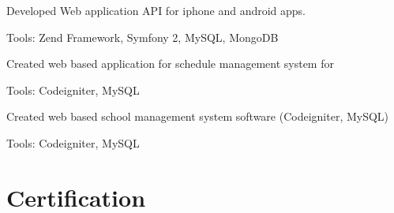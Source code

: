 \documentclass[]{deedy-resume-openfont}
\begin{document}
\begin{minipage}[t]{0.66\textwidth}
\begin{tightemize}
\item Developed Web application API for iphone and android apps.
\item Tools: Zend Framework, Symfony 2, MySQL, MongoDB
\end{tightemize}
\sectionsep

\begin{tightemize}
\item Created web based application for schedule management system for 
\item Tools: Codeigniter, MySQL
\end{tightemize}
\sectionsep

\begin{tightemize}
\item Created web based school management system software (Codeigniter, MySQL)
\item Tools: Codeigniter, MySQL
\end{tightemize}
\sectionsep


\section{Certification}
\href{https://www.coursera.org/account/accomplishments/certificate/PB48PJLRP5VQ}{} \\
\href{https://www.datacamp.com/courses/python-data-science-toolbox-part-1}{} \\
\href{https://www.datacamp.com/courses/python-data-science-toolbox-part-2}{} \\
\href{https://www.datacamp.com/courses/exploratory-data-analysis}{} \\
\sectionsep

\end{minipage} 
\end{document}
